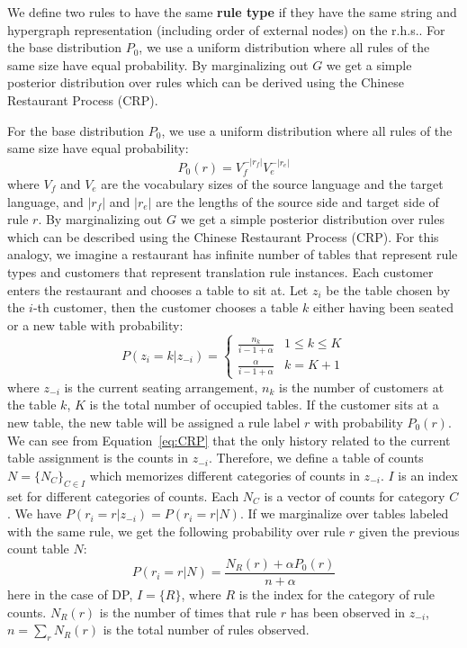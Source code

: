 We define two rules to have the same {\bf rule type} if they have the same string and hypergraph
representation (including order of external nodes) on the r.h.s..
For the base distribution $P_0$, we use a uniform distribution where all rules of the same size have equal probability.
By marginalizing out $G$ we get a simple posterior distribution over rules which can be derived using the Chinese Restaurant Process (CRP). 


For the base distribution $P_0$, we use a uniform distribution where all rules of the same size have equal probability:
\begin{equation}
P_0 (r) = V_f^{-|r_f|} V_e^{-|r_e|}
\end{equation}
where $V_f$ and $V_e$ are the vocabulary sizes of the source language and the target language, and $|r_f|$ and $|r_e|$ are the lengths of the source side and target side of rule $r$. By marginalizing out $G$ we get a simple posterior distribution over rules which can be described using the Chinese Restaurant Process (CRP). For this
analogy, we imagine a restaurant has infinite number of tables that represent rule types and customers that represent translation rule
instances. Each customer enters the restaurant and chooses a table to sit at. Let $z_i$ be the table chosen by the $i$-th customer, then the customer chooses a table $k$ either having been seated or a new table with probability:
\begin{equation}
\label{eq:CRP}
P(z_i = k| z_{-i}) = \begin{cases} \frac{n_k}{i-1+\alpha} & 1 \leq k \leq K  \\ \frac{\alpha}{i-1+\alpha} & k = K+1\end{cases}
\end{equation}
where $z_{-i}$ is the current seating arrangement, $n_k$ is the number of customers at the table $k$, 
$K$ is the total number of occupied tables. If the customer sits at a new table, the new table will be 
assigned a rule label $r$ with probability $P_0(r)$. We can see from Equation~\ref{eq:CRP} that the 
only history related to the current table assignment is the counts in $z_{-i}$. Therefore, we define a 
table of counts $N=\{N_C\}_{C\in I}$ which memorizes different categories of counts in $z_{-i}$. $I$ 
is an index set for different categories of counts. Each $N_C$ is a vector of counts for category $C$. We have $P(r_i = r| z_{-i})= P(r_i = r| N)$. If we marginalize over tables labeled with the same rule, 
we get the following probability over rule $r$ given the previous count table $N$:
\begin{equation}
P(r_i = r| N) = \frac{N_R(r) + \alpha P_0 (r)}{n + \alpha }
\end{equation}
here in the case of DP, $I=\{R\}$, where $R$ is the index for the category of rule counts. $N_R(r)$ is the number of times that rule $r$ has been observed in $z_{-i}$, $n=\sum_r N_R(r)$ is the total number of rules observed.


